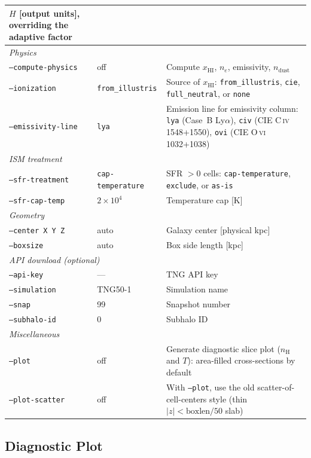 \documentclass[english,a4paper]{my_memo}
\begin{document}
\begin{longtable}{p{4.5cm}p{2.5cm}p{7cm}}
  $H$ [output units], overriding the adaptive factor \\
\midrule
\multicolumn{3}{l}{\textit{Physics}} \\
\texttt{--compute-physics}  & off & Compute $x_\mathrm{HI}$, $n_e$, emissivity, $n_\mathrm{dust}$ \\
\texttt{--ionization}
  & \texttt{from\_illustris}
  & Source of $x_\mathrm{HI}$: \texttt{from\_illustris}, \texttt{cie},
    \texttt{full\_neutral}, or \texttt{none} \\
\texttt{--emissivity-line}
  & \texttt{lya}
  & Emission line for emissivity column:
    \texttt{lya} (Case~B Ly$\alpha$),
    \texttt{civ} (CIE C\,\textsc{iv} 1548+1550),
    \texttt{ovi} (CIE O\,\textsc{vi} 1032+1038) \\
\midrule
\multicolumn{3}{l}{\textit{ISM treatment}} \\
\texttt{--sfr-treatment}
  & \texttt{cap-\newline temperature}
  & SFR $>0$ cells: \texttt{cap-temperature},
    \texttt{exclude}, or \texttt{as-is} \\
\texttt{--sfr-cap-temp}  & $2\times10^4$ & Temperature cap [K] \\
\midrule
\multicolumn{3}{l}{\textit{Geometry}} \\
\texttt{--center X Y Z}  & auto & Galaxy center [physical kpc] \\
\texttt{--boxsize}  & auto & Box side length [kpc] \\
\midrule
\multicolumn{3}{l}{\textit{API download (optional)}} \\
\texttt{--api-key}    & --- & TNG API key \\
\texttt{--simulation} & TNG50-1 & Simulation name \\
\texttt{--snap}        & 99 & Snapshot number \\
\texttt{--subhalo-id}  & 0  & Subhalo ID \\
\midrule
\multicolumn{3}{l}{\textit{Miscellaneous}} \\
\texttt{--plot}  & off & Generate diagnostic slice plot ($n_\mathrm{H}$
  and $T$): area-filled cross-sections by default \\
\texttt{--plot-scatter}  & off & With \texttt{--plot}, use the old
  scatter-of-cell-centers style (thin $|z|<\mathrm{boxlen}/50$ slab) \\
\bottomrule
\end{longtable}

\subsection{Diagnostic Plot}
\label{sec:diagnostic_plot}
\end{document}
